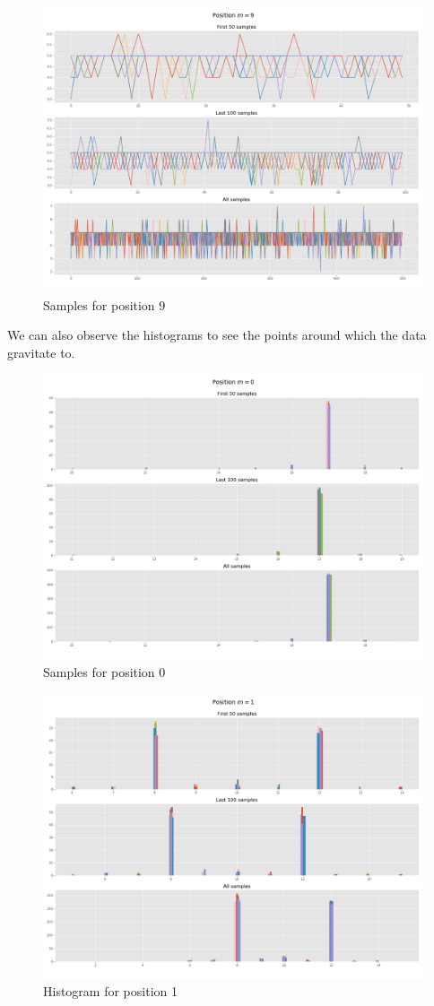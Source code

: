 \documentclass[]{article}
\begin{document}
\begin{figure}[H]
	\begin{center}
		
		\includegraphics[width=.5\textwidth]{task4/figures/T_2_4/Q2/convergence_pos9.png}
		\caption*{Samples for position 9}
	\end{center}
\end{figure}

\newpage

We can also observe the histograms to see the points around which the data gravitate to.

\begin{figure}[H]
	\begin{center}
		
		\includegraphics[width=.5\textwidth]{task4/figures/T_2_4/Q2/distribution_pos0.png}
		\caption*{Samples for position 0}
	\end{center}
\end{figure}

\begin{figure}[H]
	\begin{center}
		
		\includegraphics[width=.5\textwidth]{task4/figures/T_2_4/Q2/distribution_pos1.png}
		\caption*{Histogram for position 1}
	\end{center}
\end{figure}
\end{document}

